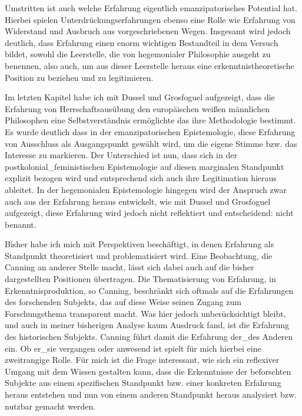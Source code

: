 Umstritten ist auch welche Erfahrung eigentlich emanzipatorisches Potential
hat. Hierbei spielen Unterdrückungserfahrungen ebenso eine Rolle wie Erfahrung
von Widerstand und Ausbruch aus vorgeschriebenen Wegen. Insgesamt wird jedoch
deutlich, dass Erfahrung einen enorm wichtigen Bestandteil in dem Versuch
bildet, sowohl die Leerstelle, die von hegemonialer Philosophie ausgeht zu
benennen, also auch, um aus dieser Leerstelle heraus eine
erkenntnistheoretische Position zu beziehen und zu legitimieren.

Im letzten Kapitel habe ich mit Dussel und Grosfoguel aufgezeigt, dass die
Erfahrung von Herrschaftsausübung den europäischen weißen männlichen
Philosophen eine Selbstverständnis ermöglichte das ihre Methodologie bestimmt.
Es wurde deutlich dass in der emanzipatorischen Epistemologie, diese Erfahrung
von Ausschluss als Ausgangspunkt gewählt wird, um die eigene Stimme bzw. das
Interesse zu markieren. Der Unterschied ist nun, dass sich in der
postkolonial\_feministischen Epistemologie auf diesen marginalen Standpunkt
explizit bezogen wird und entsprechend sich auch ihre Legitimation hieraus
ableitet. In der hegemonialen Epistemologie hingegen wird der Anspruch zwar
auch aus der Erfahrung heraus entwickelt, wie mit Dussel und Grosfoguel
aufgezeigt, diese Erfahrung wird jedoch nicht reflektiert und entscheidend:
nicht benannt.
                      
Bisher habe ich mich mit Perspektiven beschäftigt, in denen Erfahrung als
Standpunkt theoretisiert und problematisiert wird. Eine Beobachtung, die
Canning an anderer Stelle\footnotemark {} macht, lässt sich dabei auch
auf die bisher dargestellten Positionen übertragen. Die Thematisierung von
Erfahrung,  in Erkenntnisproduktion, so Canning,  beschränkt sich oftmals auf
die Erfahrungen des forschenden Subjekts, das auf diese Weise seinen Zugang zum
Forschungsthema transparent macht. Was hier jedoch unberücksichtigt bleibt, und
auch in meiner bisherigen Analyse kaum Ausdruck fand, ist die Erfahrung des
historischen Subjekts. Canning führt damit die Erfahrung der\_des Anderen ein.
Ob er\_sie vergangen oder anwesend ist spielt für mich hierbei eine zweitrangige
Rolle. Für mich ist die Frage interessant, wie sich ein reflexiver Umgang mit
dem Wissen gestalten kann, dass die Erkenntnisse der beforschten Subjekte aus
einem spezifischen Standpunkt bzw. einer konkreten Erfahrung heraus entstehen
und nun von einem anderen Standpunkt heraus analysiert bzw. nutzbar gemacht
werden.                    

